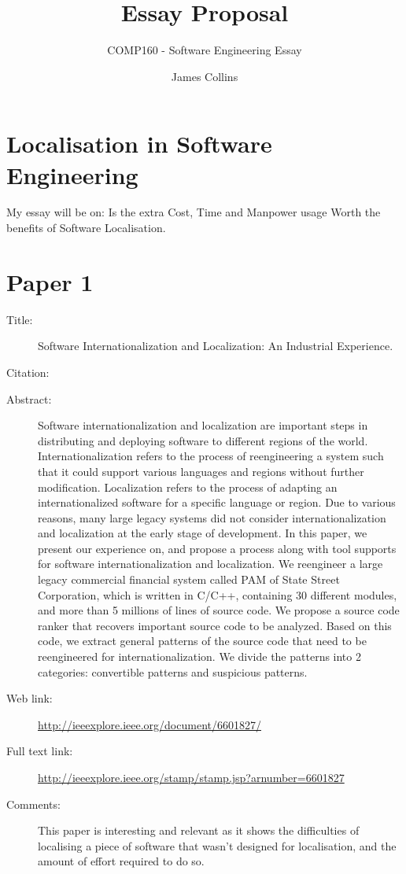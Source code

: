 \documentclass{scrartcl}
\title{Essay Proposal}
\subtitle{COMP160 - Software Engineering Essay}
\author{James Collins}
\begin{document}
\maketitle

\section*{Localisation in Software Engineering}

My essay will be on: Is the extra Cost, Time and Manpower usage Worth the benefits of Software Localisation.


\section*{Paper 1}
\begin{description}
\item[Title:]Software Internationalization and Localization: An Industrial Experience.
\item[Citation:] \cite{Xia2013software}
\item[Abstract:] Software internationalization and localization are important steps
 in distributing and deploying software to different regions of the world. 
Internationalization refers to the process of reengineering a system such
 that it could support various languages and regions without further modification.
 Localization refers to the process of adapting an internationalized software 
for a specific language or region. Due to various reasons, many large legacy 
systems did not consider internationalization and localization at the early stage of development. In this paper, we present our experience on, and propose 
a process along with tool supports for software internationalization and localization. We reengineer a large legacy commercial financial system called PAM 
of State Street Corporation, which is written in C/C++, containing 30 different modules, and more than 5 millions of lines of source code. We propose a 
source code ranker that recovers important source code to be analyzed. Based on this code, we extract general patterns of the source code that need
 to be reengineered for internationalization. We divide the patterns into 2 categories: convertible patterns and suspicious patterns. 
\item[Web link:] \url{http://ieeexplore.ieee.org/document/6601827/}
\item[Full text link:] \url{http://ieeexplore.ieee.org/stamp/stamp.jsp?arnumber=6601827}
\item[Comments:]This paper is interesting and relevant as it shows the difficulties of localising a piece of software that wasn't designed for localisation, and the amount of effort required to do so.
\end{description}
\end{document}
